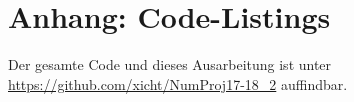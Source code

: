 \documentclass[a4paper,11pt,bibliography=totoc,listof=totoc,headinclude=true,cleardoublepage=empty,oneside]{scrartcl}
\newcommand{\R}{\mathbb{R}}
\begin{document}
\section{Anhang: Code-Listings}
Der gesamte Code und dieses Ausarbeitung ist unter \url{https://github.com/xicht/NumProj17-18_2} auffindbar.
%
\end{document}
